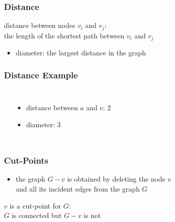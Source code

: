 \documentclass[dvipsnames]{beamer}
\begin{document}
\begin{frame}
  \frametitle{Distance}

  \begin{definition}
    \alert{distance} between nodes $v_i$ and $v_j$:\\
    the length of the shortest path between $v_i$ and $v_j$
  \end{definition}

  \begin{itemize}
    \item \alert{diameter}: the largest distance in the graph
  \end{itemize}
\end{frame}

\begin{frame}
  \frametitle{Distance Example}

  \begin{example}
    \begin{columns}
      \begin{center}
      \end{center}

      \begin{itemize}
        \item distance between $a$ and $e$: 2\\
        \item diameter: 3
      \end{itemize}
    \end{columns}
  \end{example}
\end{frame}

\begin{frame}
  \frametitle{Cut-Points}

    \begin{itemize}
      \item the graph \alert{$G - v$} is obtained by deleting the node $v$\\
        and all its incident edges from the graph $G$
    \end{itemize}

  \begin{definition}
    $v$ is a \alert{cut-point} for $G$:\\
      $G$ is connected but $G - v$ is not
  \end{definition}
\end{frame}
\end{document}
